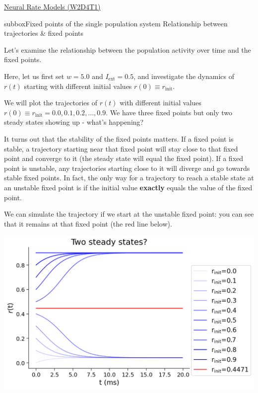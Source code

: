 \begin{textbox}{\href{https://compneuro.neuromatch.io/tutorials/W2D4_DynamicNetworks/chapter_title.html}{Neural Rate Models (W2D4T1)} }
\begin{subbox}{subbox}{Fixed points of the single population system}
\scriptsize
Relationship between trajectories & fixed points

Let's examine the relationship between the population activity over time and the fixed points.

Here, let us first set $w=5.0$ and $I_{\text{ext}}=0.5$, and investigate the dynamics of $r(t)$ starting with different initial values $r(0) \equiv r_{\text{init}}$. 


We will plot the trajectories of $r(t)$ with different initial values $r(0) \equiv r_{\text{init}}  = 0.0, 0.1, 0.2,..., 0.9$.
We have three fixed points but only two steady states showing up - what's happening? 

It turns out that the stability of the fixed points matters. If a fixed point is stable, a trajectory starting near that fixed point will stay close to that fixed point and converge to it (the steady state will equal the fixed point). If a fixed point is unstable, any trajectories starting close to it will diverge and go towards stable fixed points. In fact, the only way for a trajectory to reach a stable state at an unstable fixed point is if the initial value \textbf{exactly} equals the value of the fixed point.

We can simulate the trajectory if we start at the unstable fixed point: you can see that it remains at that fixed point (the red line below).

\begin{center}
\includegraphics[scale=0.3]{Figures/DN/DN_Figure4.png}
\end{center}
\end{subbox}

\end{textbox}

